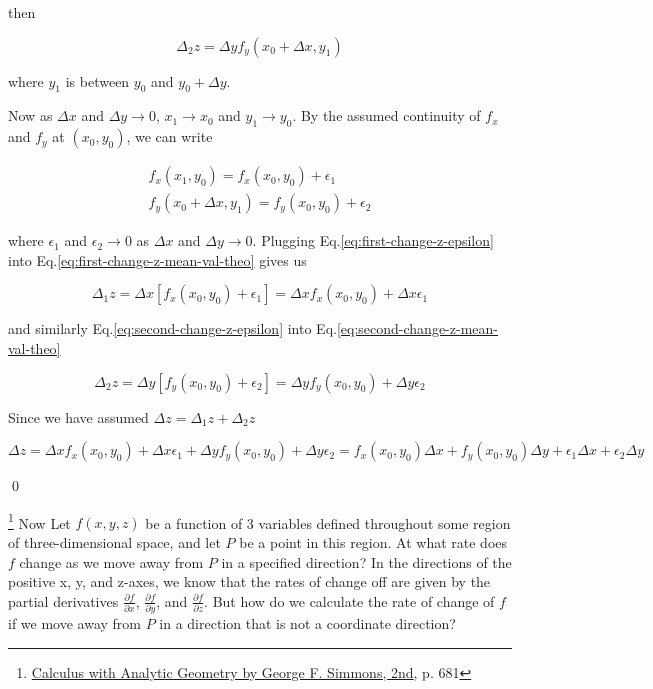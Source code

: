then

\begin{equation}\label{eq:second-change-z-mean-val-theo}
\Delta_2 z = \Delta y f_y(x_0 + \Delta x, y_1)
\end{equation}

where $y_1$ is between $y_0$ and $y_0 + \Delta y$.

Now as $\Delta x$ and $\Delta y \rightarrow 0$, $x_1 \rightarrow x_0$ and $y_1 \rightarrow y_0$. By the assumed
continuity of $f_x$ and $f_y$ at $(x_0, y_0)$, we can write

\begin{align}
    f_x(x_1, y_0) = f_x(x_0, y_0) + \epsilon_1 \label{eq:first-change-z-epsilon} \\
    f_y(x_0 + \Delta x, y_1) = f_y(x_0, y_0) + \epsilon_2 \label{eq:second-change-z-epsilon}
\end{align}

where $\epsilon_1$ and $\epsilon_2 \rightarrow 0$ as $\Delta x$ and $\Delta y \rightarrow 0$. Plugging
Eq.\ref{eq:first-change-z-epsilon} into Eq.\ref{eq:first-change-z-mean-val-theo} gives us

\begin{equation}
    \Delta_1 z = \Delta x\left[ f_x(x_0, y_0) + \epsilon_1 \right] = \Delta x f_x(x_0, y_0) + \Delta x\epsilon_1
\end{equation}

and similarly Eq.\ref{eq:second-change-z-epsilon} into Eq.\ref{eq:second-change-z-mean-val-theo}

\begin{equation}
    \Delta_2 z = \Delta y\left[ f_y(x_0, y_0) + \epsilon_2 \right] = \Delta y f_y(x_0, y_0) + \Delta y\epsilon_2
\end{equation}

Since we have assumed $\Delta z = \Delta_1 z + \Delta_2 z$

\begin{equation}
    \Delta z = \Delta x f_x(x_0, y_0) + \Delta x\epsilon_1 + \Delta y f_y(x_0, y_0) + \Delta y\epsilon_2 = f_x(x_0, y_0)\Delta x + f_y(x_0, y_0)\Delta y + \epsilon_1\Delta x + \epsilon_2\Delta y
\end{equation}

\qed

\footnote{\href{https://trello.com/c/byu9Pyy8}{Calculus with Analytic Geometry by George F. Simmons, 2nd}, p. 681} Now Let
$f(x, y, z)$ be a function of 3 variables defined throughout some region of three-dimensional space, and let $P$ be a
point in this region. At what rate does $f$ change as we move away from $P$ in a specified direction? In the directions
of the positive x, y, and z-axes, we know that the rates of change off are given by the partial derivatives
$\frac{\partial f}{\partial x}$, $\frac{\partial f}{\partial y}$, and $\frac{\partial f}{\partial z}$. But how do we
calculate the rate of change of $f$ if we move away from $P$ in a direction that is not a coordinate direction?

